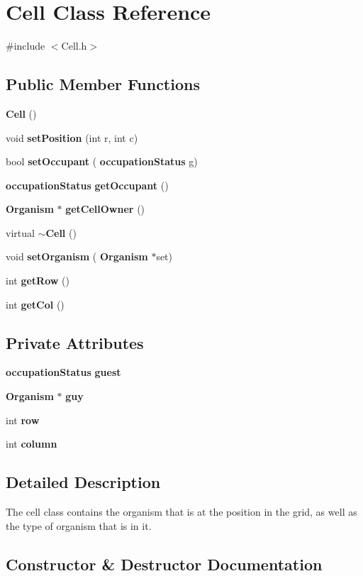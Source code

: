 \section{Cell Class Reference}
\label{classCell}


{\ttfamily \#include $<$Cell.\+h$>$}

\subsection*{Public Member Functions}
\begin{DoxyCompactItemize}
\item 
\textbf{ Cell} ()
\item 
void \textbf{ set\+Position} (int r, int c)
\item 
bool \textbf{ set\+Occupant} (\textbf{ occupation\+Status} g)
\item 
\textbf{ occupation\+Status} \textbf{ get\+Occupant} ()
\item 
\textbf{ Organism} $\ast$ \textbf{ get\+Cell\+Owner} ()
\item 
virtual \textbf{ $\sim$\+Cell} ()
\item 
void \textbf{ set\+Organism} (\textbf{ Organism} $\ast$set)
\item 
int \textbf{ get\+Row} ()
\item 
int \textbf{ get\+Col} ()
\end{DoxyCompactItemize}
\subsection*{Private Attributes}
\begin{DoxyCompactItemize}
\item 
\textbf{ occupation\+Status} \textbf{ guest}
\item 
\textbf{ Organism} $\ast$ \textbf{ guy}
\item 
int \textbf{ row}
\item 
int \textbf{ column}
\end{DoxyCompactItemize}


\subsection{Detailed Description}
The cell class contains the organism that is at the position in the grid, as well as the type of organism that is in it. 

\subsection{Constructor \& Destructor Documentation}
\mbox{\label{classCell_a394510643e8664cf12b5efaf5cb99f71}} 
